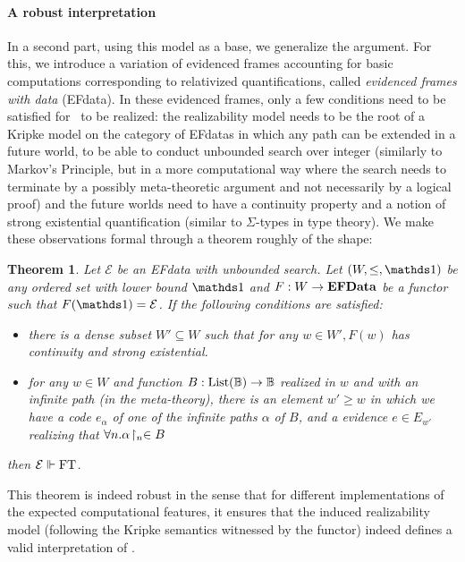 \documentclass{easychair}
\newtheorem{theorem}{Theorem}
\begin{document}
\paragraph{A robust interpretation}
In a second part, using this model as a base, we generalize the argument. For this, we introduce a variation of evidenced frames accounting for basic computations corresponding to relativized quantifications, called \emph{evidenced frames with data} (EFdata). In these evidenced frames, only a few conditions need to be satisfied for \FT\ to be realized: the realizability model needs to be the root of a Kripke model on the category of EFdatas in which any path can be extended in a future world, to be able to conduct unbounded search over integer (similarly to Markov's Principle, but in a more computational way where the search needs to terminate by a possibly meta-theoretic argument and not necessarily by a logical proof) and the future worlds need to have a continuity property and a notion of strong existential quantification (similar to $\Sigma$-types in type theory).
We make these observations formal through a theorem roughly of the shape:
\renewcommand{\real}{\Vdash}
\begin{theorem}\label{thm:main}
  Let $\mathcal E$ be an EFdata with unbounded search. Let $(W,\leq,\bOne)$ be any ordered set with lower bound $\bOne$ and $F : W \to \mathbf{EFData}$ be a functor such that $F(\bOne) = \EFE$. If the following conditions are satisfied:
  \begin{itemize}
  \item there is a dense subset $W' \subseteq W$ such that for any $w \in W', F(w)$ has continuity and strong existential.
  \item for any $w \in W$ and function $B : \mathrm{List}(\mathbb B) \to \mathbb B$ realized in $w$ and with an infinite path (in the meta-theory), there is an element $w' \geq w$ in which we have a code $e_\alpha$ of one of the infinite paths $\alpha$ of $B$, and a evidence $e \in E_{w'}$ realizing that $\forall n.{\alpha}\!\upharpoonright_{n} \in B$
  \end{itemize}
  then $\mathcal{E} \Vdash \mathrm{FT}$.
\end{theorem}
This theorem is indeed robust in the sense that for different implementations of the expected computational features, it ensures that the induced realizability model  (following the Kripke semantics witnessed by the functor) indeed defines a valid interpretation of \FT.
\newpage




\end{document}
